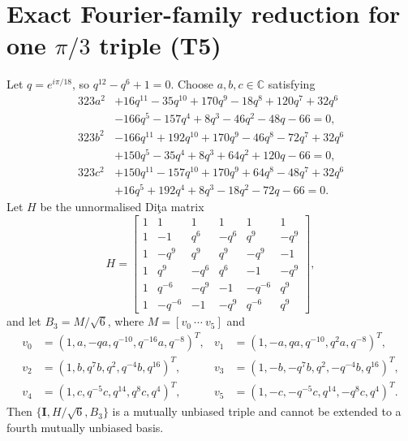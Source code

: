 \section{Exact Fourier-family reduction for one $\pi/3$ triple (T5)}
\label{sec:proof-t5}

\begin{theorem}
\label{thm:T5}
Let $q=e^{i\pi/18}$, so $q^{12}-q^6+1=0$. Choose $a,b,c\in\mathbb{C}$ satisfying
\begin{align*}
323a^2&+16q^{11}-35q^{10}+170q^9-18q^8+120q^7+32q^6\\
&-166q^5-157q^4+8q^3-46q^2-48q-66=0,\\
323b^2&-166q^{11}+192q^{10}+170q^9-46q^8-72q^7+32q^6\\
&+150q^5-35q^4+8q^3+64q^2+120q-66=0,\\
323c^2&+150q^{11}-157q^{10}+170q^9+64q^8-48q^7+32q^6\\
&+16q^5+192q^4+8q^3-18q^2-72q-66=0.
\end{align*}
Let $H$ be the unnormalised Di\c{t}a matrix
\[
H=\begin{bmatrix}
1&1&1&1&1&1\\
1&-1&q^6&-q^6&q^9&-q^9\\
1&-q^9&q^9&q^9&-q^9&-1\\
1&q^9&-q^6&q^6&-1&-q^9\\
1&q^{-6}&-q^9&-1&-q^{-6}&q^9\\
1&-q^{-6}&-1&-q^9&q^{-6}&q^9
\end{bmatrix},
\]
and let $B_3=M/\sqrt6$, where $M=[v_0\ \cdots\ v_5]$ and
\begin{align*}
v_0&=(1,a,-qa,q^{-10},q^{-16}a,q^{-8})^T,&
v_1&=(1,-a,qa,q^{-10},q^2a,q^{-8})^T,\\
v_2&=(1,b,q^7b,q^2,q^{-4}b,q^{16})^T,&
v_3&=(1,-b,-q^7b,q^2,-q^{-4}b,q^{16})^T,\\
v_4&=(1,c,q^{-5}c,q^{14},q^8c,q^4)^T,&
v_5&=(1,-c,-q^{-5}c,q^{14},-q^8c,q^4)^T.
\end{align*}
Then $\{\mathbf{I},H/\sqrt6,B_3\}$ is a mutually unbiased triple and cannot be extended to a fourth mutually unbiased basis.
\end{theorem}

